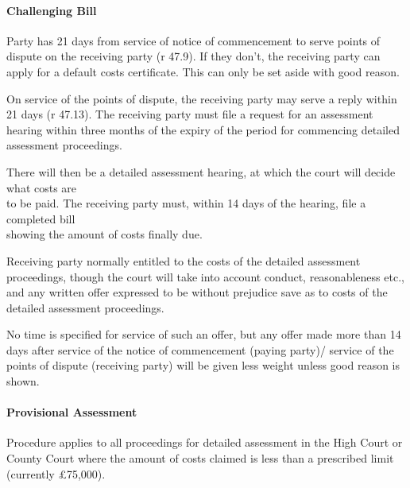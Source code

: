 \documentclass[
]{article}
\begin{document}
\hypertarget{challenging-bill}{%
\paragraph{Challenging Bill}\label{challenging-bill}}

Party has 21 days from service of notice of commencement to serve points
of dispute on the receiving party (r 47.9). If they don't, the receiving
party can apply for a default costs certificate. This can only be set
aside with good reason.

On service of the points of dispute, the receiving party may serve a
reply within 21 days (r 47.13). The receiving party must file a request
for an assessment hearing within three months of the expiry of the
period for commencing detailed assessment proceedings.

There will then be a detailed assessment hearing, at which the court
will decide what costs are\\
to be paid. The receiving party must, within 14 days of the hearing,
file a completed bill\\
showing the amount of costs finally due.

Receiving party normally entitled to the costs of the detailed
assessment proceedings, though the court will take into account conduct,
reasonableness etc., and any written offer expressed to be without
prejudice save as to costs of the detailed assessment proceedings.

No time is specified for service of such an offer, but any offer made
more than 14 days after service of the notice of commencement (paying
party)/ service of the points of dispute (receiving party) will be given
less weight unless good reason is shown.

\hypertarget{provisional-assessment}{%
\paragraph{Provisional Assessment}\label{provisional-assessment}}

Procedure applies to all proceedings for detailed assessment in the High
Court or County Court where the amount of costs claimed is less than a
prescribed limit (currently £75,000).
\end{document}
